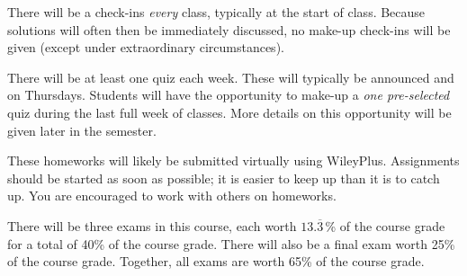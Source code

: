 \documentclass[11pt,letterpaper]{article}
\begin{document}
There will be a check-ins \textit{every} class, typically at the start of class. Because solutions will often then be immediately discussed, no make-up check-ins will be given (except under extraordinary circumstances). \pspace


There will be at least one quiz each week. These will typically be announced and on Thursdays. Students will have the opportunity to make-up a \textit{one pre-selected} quiz during the last full week of classes. More details on this opportunity will be given later in the semester.
\pspace


These homeworks will likely be submitted virtually using WileyPlus. Assignments should be started as soon as possible; it is easier to keep up than it is to catch up. You are encouraged to work with others on homeworks. \pspace


There will be three exams in this course, each worth $13.\overline{3}\,$\% of the course grade for a total of 40\% of the course grade. There will also be a final exam worth 25\% of the course grade. Together, all exams are worth 65\% of the course grade. 
\pspace
\end{document}

